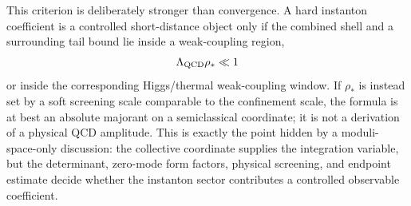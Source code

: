 \begin{controlledapproximation}
This criterion is deliberately stronger than convergence.  A hard instanton
coefficient is a controlled short-distance object only if the combined shell
and a surrounding tail bound lie inside a weak-coupling region,
\[
  \Lambda_{\rm QCD}\rho_*\ll1
\]
or inside the corresponding Higgs/thermal weak-coupling window.  If
\(\rho_*\) is instead set by a soft screening scale comparable to the
confinement scale, the formula is at best an absolute majorant on a
semiclassical coordinate; it is not a derivation of a physical QCD amplitude.
This is exactly the point hidden by a moduli-space-only discussion: the
collective coordinate supplies the integration variable, but the determinant,
zero-mode form factors, physical screening, and endpoint estimate decide
whether the instanton sector contributes a controlled observable coefficient.
\end{controlledapproximation}

